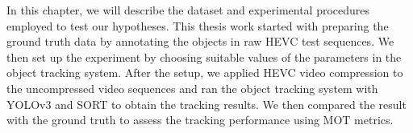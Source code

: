 In this chapter, we will describe the dataset and experimental procedures employed to test our hypotheses. This thesis work started with preparing the ground truth data by annotating the objects in raw HEVC test sequences. We then set up the experiment by choosing suitable values of the parameters in the object tracking system. After the setup, we applied HEVC video compression to the uncompressed video sequences and ran the object tracking system with YOLOv3 and SORT to obtain the tracking results. We then compared the result with the ground truth to assess the tracking performance using MOT metrics.